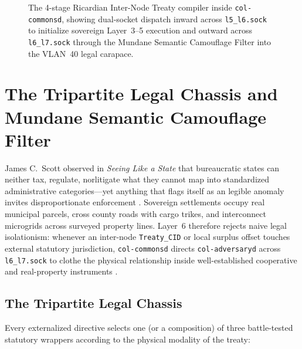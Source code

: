 \begin{figure}[htbp]
\caption{The 4-stage Ricardian Inter-Node Treaty compiler inside \texttt{col-commonsd}, showing dual-socket dispatch inward across \texttt{l5\_l6.sock} to initialize sovereign Layer~3--5 execution and outward across \texttt{l6\_l7.sock} through the Mundane Semantic Camouflage Filter into the VLAN~40 legal carapace.}
\label{fig:ricardian-camouflage-pipeline}
\end{figure}

\section{The Tripartite Legal Chassis and Mundane Semantic Camouflage Filter}
\label{sec:camouflage-legal-chassis}

James C.\ Scott observed in \emph{Seeing Like a State} that bureaucratic states can neither tax, regulate, norlitigate what they cannot map into standardized administrative categories---yet anything that flags itself as an legible anomaly invites disproportionate enforcement \parencite{scott1998}. Sovereign settlements occupy real municipal parcels, cross county roads with cargo trikes, and interconnect microgrids across surveyed property lines. Layer~6 therefore rejects naive legal isolationism: whenever an inter-node \texttt{Treaty\_CID} or local surplus offset touches external statutory jurisdiction, \texttt{col-commonsd} directs \texttt{col-adversaryd} across \texttt{l6\_l7.sock} to clothe the physical relationship inside well-established cooperative and real-property instruments \parencite{ica1995}.

\subsection{The Tripartite Legal Chassis}

Every externalized directive selects one (or a composition) of three battle-tested statutory wrappers according to the physical modality of the treaty:

